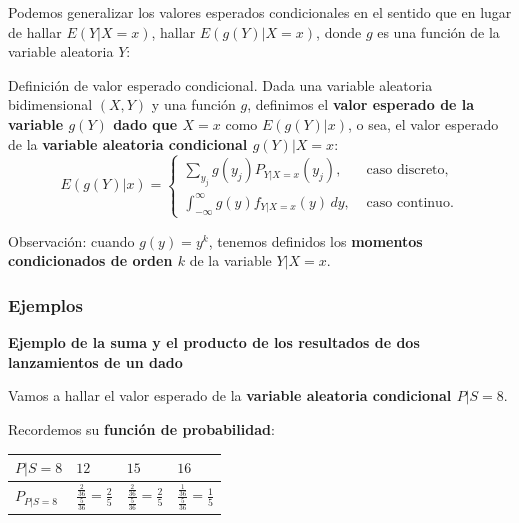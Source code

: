 \documentclass[]{book}
\begin{document}
Podemos generalizar los valores esperados condicionales en el sentido que en lugar de hallar \(E(Y|X=x)\), hallar \(E(g(Y)|X=x)\), donde \(g\) es una función de la variable aleatoria \(Y\):

Definición de valor esperado condicional.
Dada una variable aleatoria bidimensional \((X,Y)\) y una función \(g\), definimos el \textbf{valor esperado de la variable \(g(Y)\) dado que \(X=x\)} como \(E(g(Y)|x)\), o sea, el valor esperado de la \textbf{variable aleatoria condicional \(g(Y)|X=x\)}:
\[
E(g(Y)|x)=\begin{cases}
\sum_{y_j} g(y_j) P_{Y|X=x}(y_j), & \mbox{ caso discreto,}\\
\int_{-\infty}^\infty g(y) f_{Y|X=x}(y)\,dy, & \mbox{ caso continuo.}
\end{cases}
\]

Observación: cuando \(g(y)=y^k\), tenemos definidos los \textbf{momentos condicionados de orden \(k\)} de la variable \(Y|X=x\).

\hypertarget{ejemplos-11}{%
\subsubsection{Ejemplos}\label{ejemplos-11}}

\textbf{Ejemplo de la suma y el producto de los resultados de dos lanzamientos de un dado}

Vamos a hallar el valor esperado de la \textbf{variable aleatoria condicional \(P|S=8\)}.

Recordemos su \textbf{función de probabilidad}:

\begin{longtable}[]{@{}llll@{}}
\toprule
\begin{minipage}[b]{0.22\columnwidth}\raggedright
\(P|S=8\)\strut
\end{minipage} & \begin{minipage}[b]{0.22\columnwidth}\raggedright
\(12\)\strut
\end{minipage} & \begin{minipage}[b]{0.22\columnwidth}\raggedright
\(15\)\strut
\end{minipage} & \begin{minipage}[b]{0.22\columnwidth}\raggedright
\(16\)\strut
\end{minipage}\tabularnewline
\midrule
\endhead
\begin{minipage}[t]{0.22\columnwidth}\raggedright
\(P_{P|S=8}\)\strut
\end{minipage} & \begin{minipage}[t]{0.22\columnwidth}\raggedright
\(\frac{\frac{2}{36}}{\frac{5}{36}}=\frac{2}{5}\)\strut
\end{minipage} & \begin{minipage}[t]{0.22\columnwidth}\raggedright
\(\frac{\frac{2}{36}}{\frac{5}{36}}=\frac{2}{5}\)\strut
\end{minipage} & \begin{minipage}[t]{0.22\columnwidth}\raggedright
\(\frac{\frac{1}{36}}{\frac{5}{36}}=\frac{1}{5}\)\strut
\end{minipage}\tabularnewline
\bottomrule
\end{longtable}
\end{document}
